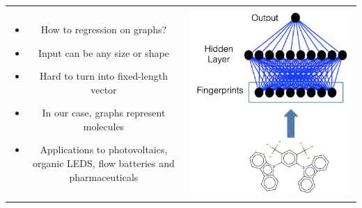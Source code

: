 \documentclass[landscape,a0b,final,a4resizeable]{include/a0poster}
\begin{document}
\begin{poster}
\begin{multicols}{3}
\begin{tabular}{cc}
\begin{minipage}[c]{0.45\columnwidth}
\begin{itemize}
  \item How to regression on graphs?
  \item Input can be any size or shape
  \item Hard to turn into fixed-length vector
  \item In our case, graphs represent molecules
  \item Applications to photovoltaics, organic LEDS, flow batteries and pharmaceuticals
\end{itemize}
\end{minipage} & 
\begin{minipage}[c]{0.55\columnwidth}
\centerline{\includegraphics[width=1.0\columnwidth, clip, trim=4mm 0mm 4mm 4mm]{figures/how-fingerprints.png}}
\end{minipage}
\end{tabular}



\end{multicols}
\end{poster}
\end{document}
